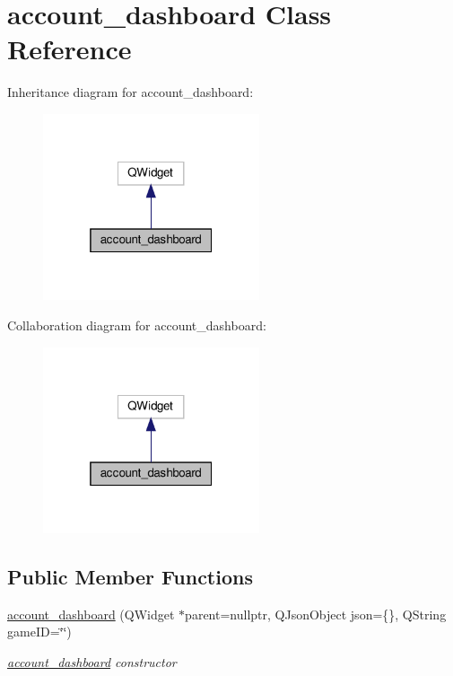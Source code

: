 \hypertarget{classaccount__dashboard}{}\section{account\+\_\+dashboard Class Reference}
\label{classaccount__dashboard}


Inheritance diagram for account\+\_\+dashboard\+:
\nopagebreak
\begin{figure}[H]
\begin{center}
\leavevmode
\includegraphics[width=181pt]{classaccount__dashboard__inherit__graph}
\end{center}
\end{figure}


Collaboration diagram for account\+\_\+dashboard\+:
\nopagebreak
\begin{figure}[H]
\begin{center}
\leavevmode
\includegraphics[width=181pt]{classaccount__dashboard__coll__graph}
\end{center}
\end{figure}
\subsection*{Public Member Functions}
\begin{DoxyCompactItemize}
\item 
\hyperlink{classaccount__dashboard_a17892d9c39fe88dd8a645c4cd6a08d26}{account\+\_\+dashboard} (Q\+Widget $\ast$parent=nullptr, Q\+Json\+Object json=\{\}, Q\+String game\+ID=\char`\"{}\char`\"{})
\begin{DoxyCompactList}\small\item\em \hyperlink{classaccount__dashboard}{account\+\_\+dashboard} constructor \end{DoxyCompactList}\end{DoxyCompactItemize}


